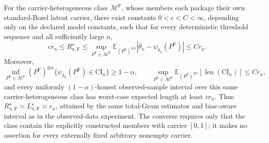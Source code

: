 For the carrier-heterogeneous class \(\mathcal M^{\mathrm F}\), whose members each package their own standard-Borel latent carrier, there exist constants \(0<c<C<\infty\), depending only on the declared model constants, such that for every deterministic threshold sequence and all sufficiently large \(n\),
\[
 c r_n\leq R_{n,\mathrm F}^\star
 \leq\sup_{P^{\mathrm F}\in\mathcal M^{\mathrm F}}
 \mathbb E_{(P^{\mathrm F})^{\otimes n}}|\widehat\theta_n-\psi_{\delta_n}(P^{\mathrm F})|
 \leq C r_n.
\]
Moreover,
\[
 \inf_{P^{\mathrm F}\in\mathcal M^{\mathrm F}}(P^{\mathrm F})^{\otimes n}
 \{\psi_{\delta_n}(P^{\mathrm F})\in\mathrm{CI}_n\}\geq1-\alpha,
 \qquad
 \sup_{P^{\mathrm F}\in\mathcal M^{\mathrm F}}
 \mathbb E_{(P^{\mathrm F})^{\otimes n}}[\operatorname{len}(\mathrm{CI}_n)]\leq Cr_n,
\]
and every uniformly \((1-\alpha)\)-honest observed-sample interval over this same carrier-heterogeneous class has worst-case expected length at least \(cr_n\). Thus \(R_{n,\mathrm F}^\star\asymp L_{n,\mathrm F}^\star\asymp r_n\), attained by the same total-Gram estimator and bias-aware interval as in the observed-data experiment. The converse requires only that the class contain the explicitly constructed members with carrier \([0,1]\); it makes no assertion for every externally fixed arbitrary nonempty carrier.